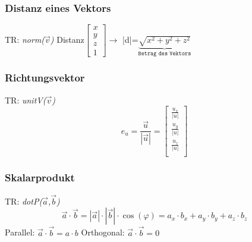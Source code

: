 %
\begin{minipage}[t]{0.33\linewidth}
     \subsubsection{Distanz eines Vektors}
     TR: \textit{norm($\vec{v}$)}\newline
    Distanz$\begin{bmatrix}
    x\\
    y\\
    z\\
    1
    \end{bmatrix}\rightarrow$ |d|=$\underbrace{\sqrt{x^2+y^2+z^2}}_{\texttt{Betrag des Vektors}}$
    
\end{minipage}
\begin{minipage}[t]{0.33\linewidth}
    \subsubsection{Richtungsvektor }
    TR: \textit{unitV($\vec{v}$)}\newline
    \[ e_u=\frac{\vec{u}}{|\vec{u}|} =
    \begin{bmatrix}
    \frac{u_x}{|u|}\\
    \frac{u_y}{|u|}\\
    \frac{u_z}{|u|}\\
    \end{bmatrix}\]  
\end{minipage}
\begin{minipage}[t]{0.33\linewidth}
    \subsubsection{Skalarprodukt }
    TR: \textit{dotP($\vec{a}$,$\vec{b}$)}\newline
    \[ \vec{a}\cdot \vec{b}= |\vec{a}|\cdot |\vec{b}| \cdot \cos(\varphi) = a_x \cdot b_x +  a_y \cdot b_y +  a_z \cdot b_z\]
    Parallel: $\vec{a}\cdot \vec{b} = a\cdot b$ \newline
    Orthogonal: $\vec{a}\cdot \vec{b} = 0$
\end{minipage}



